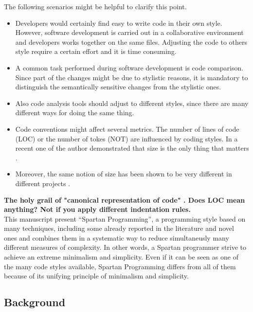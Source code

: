 The following scenarios might be helpful to clarify this point.
\begin{itemize}
    \item Developers would certainly find easy to write code in their own style. However, software
    development is carried out in a collaborative environment and developers works together on 
    the same files. Adjusting the code to others style require a certain effort and it is time consuming. 
    \item A common task performed during software development is code comparison. 
    Since part of the changes might be due to stylistic reasons, it is mandatory to distinguish the 
    semantically sensitive changes from the stylistic ones. 
    \item Also code analysis tools should adjust to different styles, since there are many
        different ways for doing the same thing.
    \item Code conventions might affect several metrics. The number of lines of code (LOC) or the number of 
    tokes (NOT) are influenced by coding styles. In a recent one of the author demonstrated that size
      is the only thing that matters \cite{Gil:Lalouche:2016}.
    \item Moreover, the same notion of size has been shown to be very different in different projects \cite{Gil:Lalouche:2016}.
\end{itemize}

\textbf{The holy grail of "canonical representation of code" .
Does LOC mean anything?
Not if you apply different indentation rules.}\\

This manuscript present ``Spartan Programming'', a programming style based on many techniques,
including some already reported in the literature and novel ones and combines them 
in a systematic way to reduce simultaneusly many different measures of complexity.
In other words, a Spartan programmer strive to achieve an extreme minimalism and simplicity.
Even if it can be seen as one of the many code styles available, Spartan Programming differs from
all of them because of its unifying principle of minimalism and simplicity.

\subsection{Background}

